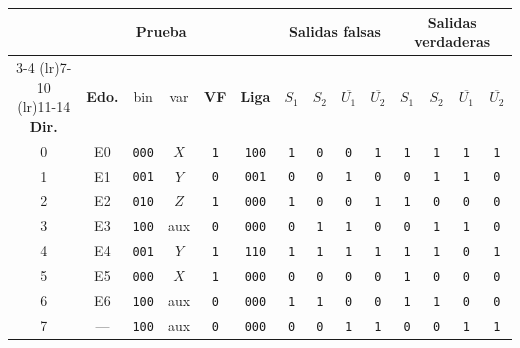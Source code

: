 \begin{tabular}{@{}c c c c c c cccc cccc@{}}
\toprule
 & & \multicolumn{2}{c}{\textbf{Prueba}} & & & \multicolumn{4}{c}{\textbf{Salidas falsas}} & \multicolumn{4}{c}{\textbf{Salidas verdaderas}} \\
\cmidrule(lr){3-4} \cmidrule(lr){7-10} \cmidrule(lr){11-14}
\textbf{Dir.} & \textbf{Edo.} & bin & var & \textbf{VF} & \textbf{Liga} & $S_1$ & $S_2$ & $\overline{U_1}$ & $\overline{U_2}$ & $S_1$ & $S_2$ & $\overline{U_1}$ & $\overline{U_2}$ \\
\midrule
0 & E0 & \texttt{000} & $X$ & \texttt{1} & \texttt{100} & \texttt{1} & \texttt{0} & \texttt{0} & \texttt{1} & \texttt{1} & \texttt{1} & \texttt{1} & \texttt{1} \\
1 & E1 & \texttt{001} & $Y$ & \texttt{0} & \texttt{001} & \texttt{0} & \texttt{0} & \texttt{1} & \texttt{0} & \texttt{0} & \texttt{1} & \texttt{1} & \texttt{0} \\
2 & E2 & \texttt{010} & $Z$ & \texttt{1} & \texttt{000} & \texttt{1} & \texttt{0} & \texttt{0} & \texttt{1} & \texttt{1} & \texttt{0} & \texttt{0} & \texttt{0} \\
3 & E3 & \texttt{100} & aux & \texttt{0} & \texttt{000} & \texttt{0} & \texttt{1} & \texttt{1} & \texttt{0} & \texttt{0} & \texttt{1} & \texttt{1} & \texttt{0} \\
4 & E4 & \texttt{001} & $Y$ & \texttt{1} & \texttt{110} & \texttt{1} & \texttt{1} & \texttt{1} & \texttt{1} & \texttt{1} & \texttt{1} & \texttt{0} & \texttt{1} \\
5 & E5 & \texttt{000} & $X$ & \texttt{1} & \texttt{000} & \texttt{0} & \texttt{0} & \texttt{0} & \texttt{0} & \texttt{1} & \texttt{0} & \texttt{0} & \texttt{0} \\
6 & E6 & \texttt{100} & aux & \texttt{0} & \texttt{000} & \texttt{1} & \texttt{1} & \texttt{0} & \texttt{0} & \texttt{1} & \texttt{1} & \texttt{0} & \texttt{0} \\
\midrule
7 & --- & \texttt{100} & aux & \texttt{0} & \texttt{000} & \texttt{0} & \texttt{0} & \texttt{1} & \texttt{1} & \texttt{0} & \texttt{0} & \texttt{1} & \texttt{1} \\
\bottomrule
\end{tabular}